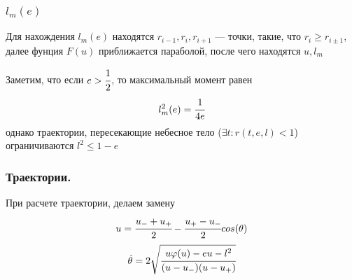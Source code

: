 	
	\subsubsection{$l_m(e)$}
	Для нахождения $l_m(e)$ находятся $r_{i-1},r_i, r_{i+1}$ --- точки, такие, что $r_i \ge r_{i\pm1}$, далее фунция $F(u)$ приближается параболой, после чего находятся $u, l_m$
	
	Заметим, что если $e>\cfrac{1}{2}$, то максимальный момент равен
	\begin{equation*}
		l^2_m(e) = \cfrac{1}{4e}
	\end{equation*}
	однако траектории, пересекающие небесное тело ($\exists t: r(t,e,l) < 1$) ограничиваются $l^2 \le 1 - e$
	
	
	
	
		\subsubsection{Траектории.}
	При расчете траектории, делаем замену
	\begin{equation*}
		u = \cfrac{u_{-}+u_{+}}{2} - \cfrac{u_{+}-u_{-}}{2}cos(\theta)
	\end{equation*}
	\begin{equation*}
		\dot{\theta} = 2\sqrt{ \cfrac{u\varphi(u)-eu-l^2}{(u-u_{-})(u-u_{+})} }
	\end{equation*}
	
